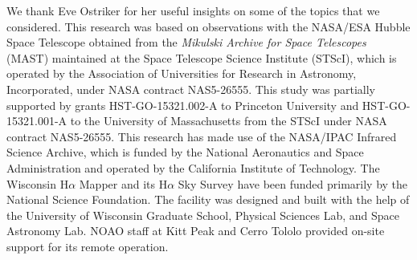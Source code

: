 \documentclass[modern]{aastex63}
\begin{document}
\acknowledgments
We thank Eve Ostriker for her useful insights on some of the topics that we considered.
This research was based on observations with the NASA/ESA Hubble Space Telescope obtained 
from the {\it Mikulski Archive for Space Telescopes\/} (MAST) maintained at the Space 
Telescope Science Institute (STScI), which is operated by the Association of Universities for 
Research in Astronomy, Incorporated, under NASA contract NAS5-26555.  This study was 
partially supported by grants HST-GO-15321.002-A to Princeton University and
HST-GO-15321.001-A to the University of Massachusetts from the STScI under NASA contract 
NAS5-26555. This research has made use of the NASA/IPAC Infrared Science Archive, which is 
funded by the National Aeronautics and Space Administration and operated by the California 
Institute of Technology.  The Wisconsin H$\alpha$ Mapper and its H$\alpha$ Sky Survey have 
been funded primarily by the National Science Foundation. The facility was designed and built 
with the help of the University of Wisconsin Graduate School, Physical Sciences Lab, and Space 
Astronomy Lab. NOAO staff at Kitt Peak and Cerro Tololo provided on-site support for its 
remote operation.
\end{document}
